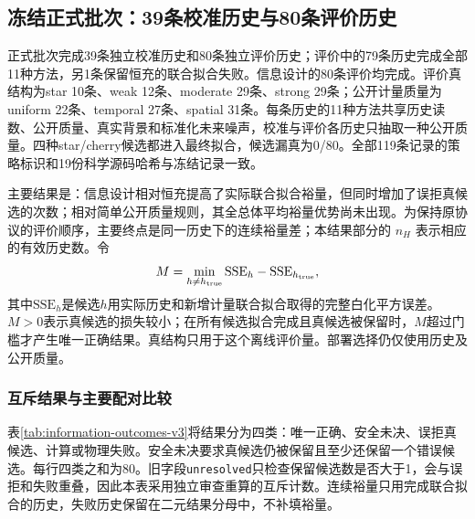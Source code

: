 
\subsection{冻结正式批次：39条校准历史与80条评价历史}
\label{sec:information-frozen-results}
正式批次完成39条独立校准历史和80条独立评价历史；评价中的79条历史完成全部11种方法，另1条保留恒充的联合拟合失败。信息设计的80条评价均完成。评价真结构为star 10条、weak 12条、moderate 29条、strong 29条；公开计量质量为uniform 22条、temporal 27条、spatial 31条。每条历史的11种方法共享历史读数、公开质量、真实背景和标准化未来噪声，校准与评价各历史只抽取一种公开质量。四种star/cherry候选都进入最终拟合，候选漏真为0/80。全部119条记录的策略标识和19份科学源码哈希与冻结记录一致。

主要结果是：信息设计相对恒充提高了实际联合拟合裕量，但同时增加了误拒真候选的次数；相对简单公开质量规则，其全总体平均裕量优势尚未出现。为保持原协议的评价顺序，主要终点是同一历史下的连续裕量差；本结果部分的 $n_H$ 表示相应的有效历史数。令
\begin{equation}
 M=\min_{h\ne h_{\rm true}}\mathrm{SSE}_h-\mathrm{SSE}_{h_{\rm true}},
 \label{eq:information-actual-margin-v3}
\end{equation}
其中$\mathrm{SSE}_h$是候选$h$用实际历史和新增计量联合拟合取得的完整白化平方误差。$M>0$表示真候选的损失较小；在所有候选拟合完成且真候选被保留时，$M$超过门槛才产生唯一正确结果。真结构只用于这个离线评价量。部署选择仍仅使用历史及公开质量。

\subsubsection{互斥结果与主要配对比较}
表\ref{tab:information-outcomes-v3}将结果分为四类：唯一正确、安全未决、误拒真候选、计算或物理失败。安全未决要求真候选仍被保留且至少还保留一个错误候选。每行四类之和为80。旧字段\texttt{unresolved}只检查保留候选数是否大于1，会与误拒和失败重叠，因此本表采用独立审查重算的互斥计数。连续裕量只用完成联合拟合的历史，失败历史保留在二元结果分母中，不补填裕量。

